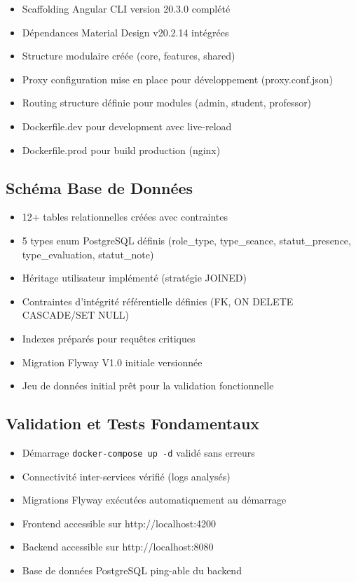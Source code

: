 \documentclass[12pt,a4paper]{report}
\begin{document}
\begin{itemize}[itemsep=0.4em]
    \item  Scaffolding Angular CLI version 20.3.0 complété
    \item  Dépendances Material Design v20.2.14 intégrées
    \item  Structure modulaire créée (core, features, shared)
    \item  Proxy configuration mise en place pour développement (proxy.conf.json)
    \item  Routing structure définie pour modules (admin, student, professor)
    \item  Dockerfile.dev pour development avec live-reload
    \item  Dockerfile.prod pour build production (nginx)
\end{itemize}

\subsection{Schéma Base de Données}

\begin{itemize}[itemsep=0.4em]
    \item  12+ tables relationnelles créées avec contraintes
    \item  5 types enum PostgreSQL définis (role\_type, type\_seance, statut\_presence, type\_evaluation, statut\_note)
    \item  Héritage utilisateur implémenté (stratégie JOINED)
    \item  Contraintes d'intégrité référentielle définies (FK, ON DELETE CASCADE/SET NULL)
    \item  Indexes préparés pour requêtes critiques
    \item  Migration Flyway V1.0 initiale versionnée
    \item  Jeu de données initial prêt pour la validation fonctionnelle
\end{itemize}

\subsection{Validation et Tests Fondamentaux}

\begin{itemize}[itemsep=0.4em]
    \item  Démarrage \texttt{docker-compose up -d} validé sans erreurs
    \item  Connectivité inter-services vérifié (logs analysés)
    \item  Migrations Flyway exécutées automatiquement au démarrage
    \item  Frontend accessible sur http://localhost:4200
    \item  Backend accessible sur http://localhost:8080
    \item  Base de données PostgreSQL ping-able du backend
\end{itemize}
\end{document}
